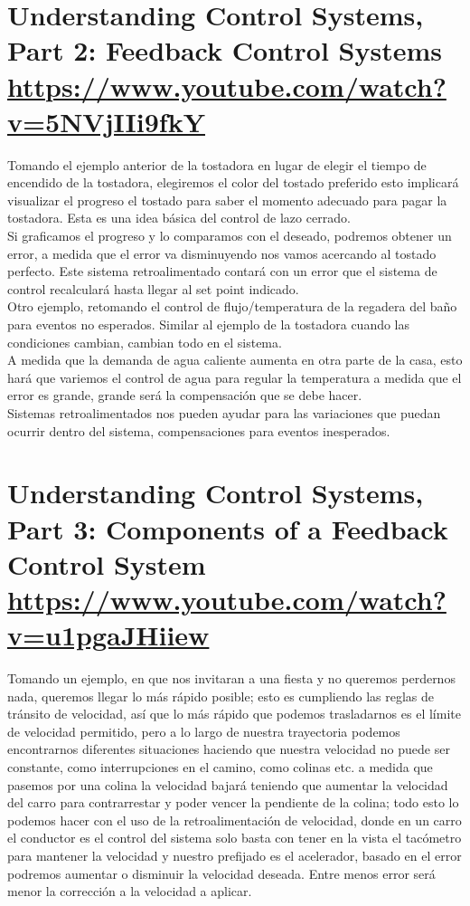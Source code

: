 \documentclass[
	12pt, %
]{fphw}
\begin{document}
\section*{{\color{Cerulean}Understanding Control Systems, Part 2: Feedback Control Systems} \url{https://www.youtube.com/watch?v=5NVjIIi9fkY}}

Tomando el ejemplo anterior de la tostadora en lugar de elegir el tiempo de encendido de la tostadora, elegiremos el color del tostado preferido esto implicará visualizar el progreso el tostado para saber el momento adecuado para pagar la tostadora. Esta es una idea básica del control de lazo cerrado. \\ 
Si graficamos el progreso y lo comparamos con el deseado, podremos obtener un error, a medida que el error va disminuyendo nos vamos acercando al tostado perfecto. Este sistema retroalimentado contará con un error que el sistema de control recalculará hasta llegar al set point indicado. \\
Otro ejemplo, retomando el control de flujo/temperatura de la regadera del baño para eventos no esperados. Similar al ejemplo de la tostadora cuando las condiciones cambian, cambian todo en el sistema. \\ 
A medida que la demanda de agua caliente aumenta en otra parte de la casa, esto hará que variemos el control de agua para regular la temperatura a medida que el error es grande, grande será la compensación que se debe hacer. \\
Sistemas retroalimentados nos pueden ayudar para las variaciones que puedan ocurrir dentro del sistema, compensaciones para eventos inesperados.

\newpage
\section*{{\color{RoyalPurple}Understanding Control Systems, Part 3: Components of a Feedback Control System} \url{https://www.youtube.com/watch?v=u1pgaJHiiew}}

Tomando un ejemplo, en que nos invitaran a una fiesta y no queremos perdernos nada, queremos llegar lo más rápido posible; esto es cumpliendo las reglas de tránsito de velocidad, así que lo más rápido que podemos trasladarnos es el límite de velocidad permitido, pero a lo largo de nuestra trayectoria podemos encontrarnos diferentes situaciones haciendo que nuestra velocidad no puede ser constante, como interrupciones en el camino, como colinas etc.  a medida que pasemos por una colina la velocidad bajará teniendo que aumentar la velocidad del carro para contrarrestar y poder vencer la pendiente de la colina; todo esto lo podemos hacer con el uso de la retroalimentación de velocidad, donde en un carro el conductor es el control del sistema solo basta con tener en la vista el tacómetro para mantener la velocidad y nuestro prefijado es el acelerador, basado en el error podremos aumentar o disminuir la velocidad deseada. Entre menos error será menor la corrección a la velocidad a aplicar. \\
\end{document}
